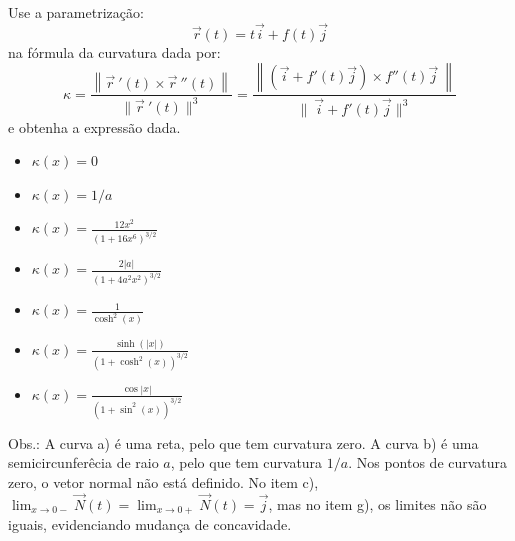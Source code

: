 \begin{resol}
  Use a parametrização:
 $$\vec{r}(t) = t\vec{i}+f(t)\vec{j}$$ na fórmula da curvatura dada por:
$$\kappa=\frac{\left\|\vec{r}~\!'(t)\times \vec{r}~\!''(t)\right\|}{\|\vec{r}~\!'(t)\|^3}=\frac{\left\|\left(\vec{i}+f'(t)\vec{j}\right)\times f''(t)\vec{j}~\!\right\|}{\|~\!\vec{i}+f'(t)\vec{j}\|^3}$$
e obtenha a expressão dada.


\begin{itemize}
\item[a)] $\kappa(x)=0$
\item[b)]$\kappa(x)=1/a$
\item[c)] $\kappa(x)=\frac{12x^2}{\left(1+16x^6\right)^{3/2}}$
\item[d)] $\kappa(x)=\frac{2|a|}{\left(1+4a^2x^2\right)^{3/2}}$
\item[e)] $\kappa(x)=\frac{1}{\cosh^2(x)}$
\item[f)] $\kappa(x)=\frac{\sinh(|x|)}{\left(1+\cosh^2(x)\right)^{3/2}}$
\item[g)] $\kappa(x)=\frac{\cos|x|}{\left(1+\sin^2(x)\right)^{3/2}}$
\end{itemize}

Obs.: A curva a) é uma reta, pelo que tem curvatura zero. A curva b) é uma semicircunferêcia de raio $a$, pelo que tem curvatura $1/a$. Nos pontos de curvatura zero, o vetor normal não está definido.
No item c), $\lim_{x\to 0-}\vec{N}(t)=\lim_{x\to 0+}\vec{N}(t)=\vec{j}$, mas no item g), os limites não são iguais, evidenciando mudança de concavidade.



\end{resol}
